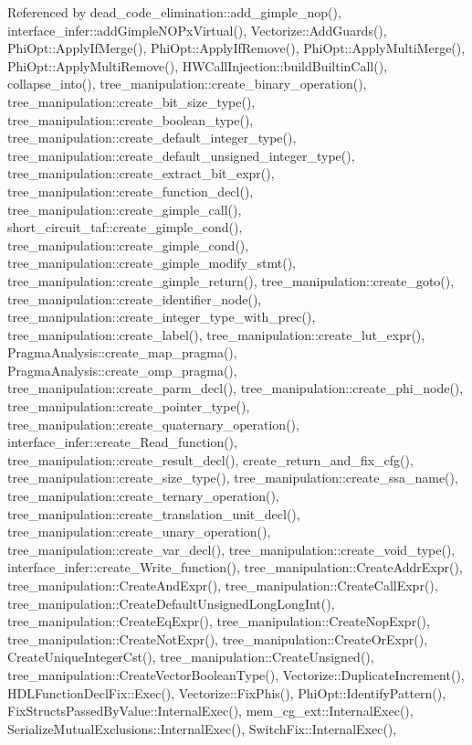 Referenced by dead\+\_\+code\+\_\+elimination\+::add\+\_\+gimple\+\_\+nop(), interface\+\_\+infer\+::add\+Gimple\+N\+O\+Px\+Virtual(), Vectorize\+::\+Add\+Guards(), Phi\+Opt\+::\+Apply\+If\+Merge(), Phi\+Opt\+::\+Apply\+If\+Remove(), Phi\+Opt\+::\+Apply\+Multi\+Merge(), Phi\+Opt\+::\+Apply\+Multi\+Remove(), H\+W\+Call\+Injection\+::build\+Builtin\+Call(), collapse\+\_\+into(), tree\+\_\+manipulation\+::create\+\_\+binary\+\_\+operation(), tree\+\_\+manipulation\+::create\+\_\+bit\+\_\+size\+\_\+type(), tree\+\_\+manipulation\+::create\+\_\+boolean\+\_\+type(), tree\+\_\+manipulation\+::create\+\_\+default\+\_\+integer\+\_\+type(), tree\+\_\+manipulation\+::create\+\_\+default\+\_\+unsigned\+\_\+integer\+\_\+type(), tree\+\_\+manipulation\+::create\+\_\+extract\+\_\+bit\+\_\+expr(), tree\+\_\+manipulation\+::create\+\_\+function\+\_\+decl(), tree\+\_\+manipulation\+::create\+\_\+gimple\+\_\+call(), short\+\_\+circuit\+\_\+taf\+::create\+\_\+gimple\+\_\+cond(), tree\+\_\+manipulation\+::create\+\_\+gimple\+\_\+cond(), tree\+\_\+manipulation\+::create\+\_\+gimple\+\_\+modify\+\_\+stmt(), tree\+\_\+manipulation\+::create\+\_\+gimple\+\_\+return(), tree\+\_\+manipulation\+::create\+\_\+goto(), tree\+\_\+manipulation\+::create\+\_\+identifier\+\_\+node(), tree\+\_\+manipulation\+::create\+\_\+integer\+\_\+type\+\_\+with\+\_\+prec(), tree\+\_\+manipulation\+::create\+\_\+label(), tree\+\_\+manipulation\+::create\+\_\+lut\+\_\+expr(), Pragma\+Analysis\+::create\+\_\+map\+\_\+pragma(), Pragma\+Analysis\+::create\+\_\+omp\+\_\+pragma(), tree\+\_\+manipulation\+::create\+\_\+parm\+\_\+decl(), tree\+\_\+manipulation\+::create\+\_\+phi\+\_\+node(), tree\+\_\+manipulation\+::create\+\_\+pointer\+\_\+type(), tree\+\_\+manipulation\+::create\+\_\+quaternary\+\_\+operation(), interface\+\_\+infer\+::create\+\_\+\+Read\+\_\+function(), tree\+\_\+manipulation\+::create\+\_\+result\+\_\+decl(), create\+\_\+return\+\_\+and\+\_\+fix\+\_\+cfg(), tree\+\_\+manipulation\+::create\+\_\+size\+\_\+type(), tree\+\_\+manipulation\+::create\+\_\+ssa\+\_\+name(), tree\+\_\+manipulation\+::create\+\_\+ternary\+\_\+operation(), tree\+\_\+manipulation\+::create\+\_\+translation\+\_\+unit\+\_\+decl(), tree\+\_\+manipulation\+::create\+\_\+unary\+\_\+operation(), tree\+\_\+manipulation\+::create\+\_\+var\+\_\+decl(), tree\+\_\+manipulation\+::create\+\_\+void\+\_\+type(), interface\+\_\+infer\+::create\+\_\+\+Write\+\_\+function(), tree\+\_\+manipulation\+::\+Create\+Addr\+Expr(), tree\+\_\+manipulation\+::\+Create\+And\+Expr(), tree\+\_\+manipulation\+::\+Create\+Call\+Expr(), tree\+\_\+manipulation\+::\+Create\+Default\+Unsigned\+Long\+Long\+Int(), tree\+\_\+manipulation\+::\+Create\+Eq\+Expr(), tree\+\_\+manipulation\+::\+Create\+Nop\+Expr(), tree\+\_\+manipulation\+::\+Create\+Not\+Expr(), tree\+\_\+manipulation\+::\+Create\+Or\+Expr(), Create\+Unique\+Integer\+Cst(), tree\+\_\+manipulation\+::\+Create\+Unsigned(), tree\+\_\+manipulation\+::\+Create\+Vector\+Boolean\+Type(), Vectorize\+::\+Duplicate\+Increment(), H\+D\+L\+Function\+Decl\+Fix\+::\+Exec(), Vectorize\+::\+Fix\+Phis(), Phi\+Opt\+::\+Identify\+Pattern(), Fix\+Structs\+Passed\+By\+Value\+::\+Internal\+Exec(), mem\+\_\+cg\+\_\+ext\+::\+Internal\+Exec(), Serialize\+Mutual\+Exclusions\+::\+Internal\+Exec(), Switch\+Fix\+::\+Internal\+Exec(), 